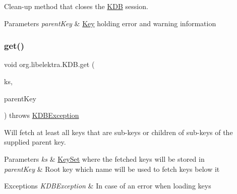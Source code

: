 Clean-\/up method that closes the \hyperlink{classorg_1_1libelektra_1_1KDB}{K\+DB} session. 


\begin{DoxyParams}{Parameters}
{\em parent\+Key} & \hyperlink{classorg_1_1libelektra_1_1Key}{Key} holding error and warning information \\
\hline
\end{DoxyParams}
\mbox{\label{classorg_1_1libelektra_1_1KDB_ac3b5b3551a9fef5dae1fb468e74272f6}} 
\subsubsection{\texorpdfstring{get()}{get()}\hspace{0.1cm}{\footnotesize\ttfamily [1/2]}}
{\footnotesize\ttfamily void org.\+libelektra.\+K\+D\+B.\+get (\begin{DoxyParamCaption}\item[{final \hyperlink{classorg_1_1libelektra_1_1KeySet}{Key\+Set}}]{ks,  }\item[{final \hyperlink{classorg_1_1libelektra_1_1Key}{Key}}]{parent\+Key }\end{DoxyParamCaption}) throws \hyperlink{classorg_1_1libelektra_1_1exception_1_1KDBException}{K\+D\+B\+Exception}\hspace{0.3cm}{\ttfamily [inline]}}



Will fetch at least all keys that are sub-\/keys or children of sub-\/keys of the supplied parent key. 


\begin{DoxyParams}{Parameters}
{\em ks} & \hyperlink{classorg_1_1libelektra_1_1KeySet}{Key\+Set} where the fetched keys will be stored in \\
\hline
{\em parent\+Key} & Root key which name will be used to fetch keys below it \\
\hline
\end{DoxyParams}

\begin{DoxyExceptions}{Exceptions}
{\em K\+D\+B\+Exception} & In case of an error when loading keys \\
\hline
\end{DoxyExceptions}
\mbox{\label{classorg_1_1libelektra_1_1KDB_a600abc786bde91a3122bd96be991a3d5}} 
